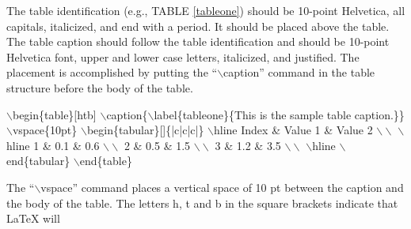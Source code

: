 \documentclass[letterpaper,10pt,twocolumn]{../aspe}
\begin{document}
The table identification (e.g., TABLE \ref{tableone}) should be 10-point
Helvetica, all capitals, italicized, and end with a period. It should be
placed above the table.
The table caption should follow the table identification and should be
10-point Helvetica font, upper and lower case letters, italicized, and
justified.  The placement is accomplished by putting the
``$\backslash$caption'' command in the table structure before the body of
the table.
    {\topsep=0pt
        \begin{flushleft}
            \hspace*{3mm}$\backslash$begin\{table\}[htb]\linebreak
            \hspace*{3mm}$\backslash$caption\{$\backslash$label\{tableone\}\{This
            is\linebreak
            \hspace*{6mm} the sample table caption.\}\}\linebreak
            \hspace*{3mm}$\backslash$vspace\{10pt\}\linebreak
            \hspace*{3mm}$\backslash$begin\{tabular\}[]\{|c|c|c|\}\linebreak
            \hspace*{3mm}$\backslash$hline\linebreak
            \hspace*{3mm}Index \& Value 1 \& Value 2 $\backslash\backslash$
            $\backslash$hline\linebreak
            \hspace*{3mm}1 \& 0.1 \& 0.6 $\backslash\backslash$\linebreak
            \hspace*{3mm}2 \& 0.5 \& 1.5 $\backslash\backslash$\linebreak
            \hspace*{3mm}3 \& 1.2 \& 3.5 $\backslash\backslash$ $\backslash$hline
            \linebreak
            \hspace*{3mm}$\backslash$end\{tabular\}\linebreak
            \hspace*{3mm}$\backslash$end\{table\}
        \end{flushleft}
    }
The ``$\backslash$vspace'' command places a vertical space of 10 pt
between the caption and the body of the table.
The letters h, t and b in the square brackets indicate that LaTeX will
\end{document}
